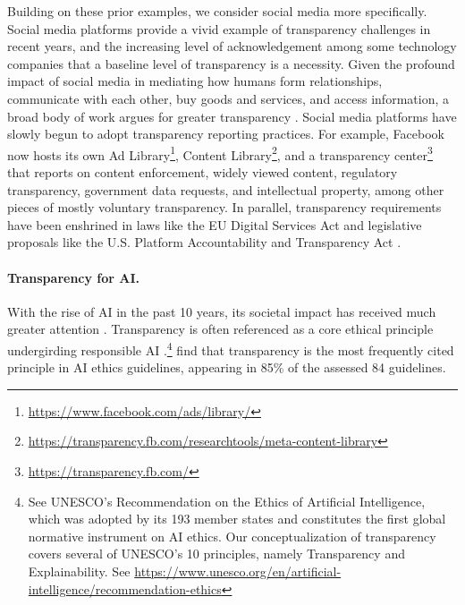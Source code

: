 Building on these prior examples, we consider social media more specifically.
Social media platforms provide a vivid example of transparency challenges in recent years, and the increasing level of acknowledgement among some technology companies that a baseline level of transparency is a necessity. 
Given the profound impact of social media in mediating how humans form relationships, communicate with each other, buy goods and services, and access information, a broad body of work argues for greater transparency \citep[see][]{keller2022platform}. 
Social media platforms have slowly begun to adopt transparency reporting practices.
For example, Facebook now hosts its own Ad Library\footnote{\url{https://www.facebook.com/ads/library/}}, Content Library\footnote{\url{https://transparency.fb.com/researchtools/meta-content-library}}, and a transparency center\footnote{\url{https://transparency.fb.com/}} that reports on content enforcement, widely viewed content, regulatory transparency, government data requests, and intellectual property, among other pieces of mostly voluntary transparency.
In parallel, transparency requirements have been enshrined in laws like the EU Digital Services Act \citep{dsa2022} and legislative proposals like the U.S. Platform Accountability and Transparency Act \citep{pata2021}. 

\paragraph{Transparency for AI.}
With the rise of AI in the past 10 years, its societal impact has received much greater attention \citep{barocas2016, abebe2020roles, hutchinson2021towards, bender2021dangers}.
Transparency is often referenced as a core ethical principle undergirding responsible AI \citep{fjeld2020principled, Hagendorff2020}.\footnote{See UNESCO's Recommendation on the Ethics of Artificial Intelligence, which was adopted by its 193 member states and constitutes the first global normative instrument on AI ethics. Our conceptualization of transparency covers several of UNESCO's 10 principles, namely Transparency and Explainability. See \url{https://www.unesco.org/en/artificial-intelligence/recommendation-ethics}} 
\citet{jobin2019global} find that transparency is the most frequently cited principle in AI ethics guidelines, appearing in 85\% of the assessed 84 guidelines. 

